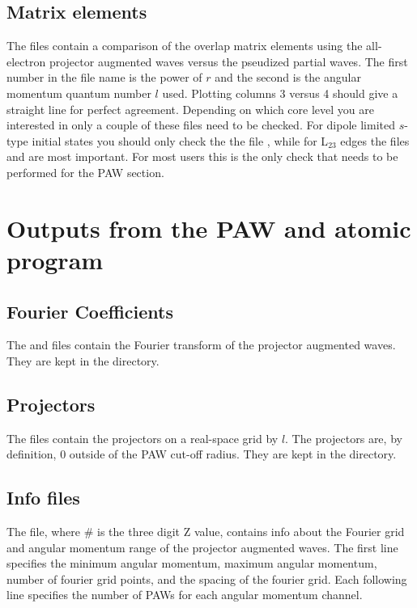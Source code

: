 \documentclass[11pt]{report}
\begin{document}
\subsection{Matrix elements}
The  files contain a comparison of the overlap matrix elements using the all-electron projector augmented waves versus the pseudized partial waves. The first number in the 
file name is the power of $r$ and the second is the angular momentum quantum number $l$ used. Plotting columns 3 versus 4 should give a straight line for perfect 
agreement. Depending on which core level you are interested in only a couple of these files need to be checked. For dipole limited $s$-type initial states you should only check the the file , while for L$_{23}$ edges the files  and  are most important. For most users this is the only check that needs to be performed for the PAW section.

\section{Outputs from the PAW and atomic program}

\subsection{Fourier Coefficients}
The  and  files contain the Fourier transform of the projector augmented waves. They are kept in the  directory.

\subsection{Projectors}
The  files contain the projectors on a real-space grid by $l$. The projectors are, by definition, 0 outside of the PAW cut-off radius. They are kept in the  directory.

\subsection{Info files}
The  file, where \# is the three digit Z value, contains info about the Fourier grid and angular momentum range of the projector augmented waves. The first line specifies the minimum angular momentum, maximum angular momentum, number of fourier grid points, and the spacing of the fourier grid. Each following line specifies the number of PAWs for each angular momentum channel. 
\end{document}
